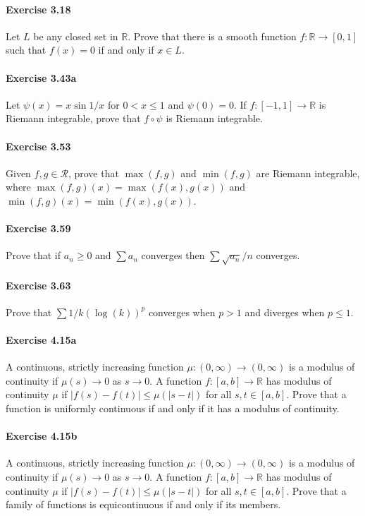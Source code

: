 \documentclass{article}
\begin{document}
\paragraph{Exercise 3.18} Let $L$ be any closed set in $\mathbb{R}$. Prove that there is a smooth function $f \colon \mathbb{R} \rightarrow [0, 1]$ such that $f(x) = 0$ if and only if $x \in L$.

\paragraph{Exercise 3.43a} Let $\psi(x) = x \sin 1/x$ for $0 < x \leq 1$ and $\psi(0) = 0$.  If $f \colon [-1, 1] \rightarrow \mathbb{R}$ is Riemann integrable, prove that $f \circ \psi$ is Riemann integrable.

\paragraph{Exercise 3.53} Given $f, g \in \mathcal{R}$, prove that $\max(f, g)$ and $\min(f, g)$ are Riemann integrable, where $\max(f, g)(x) = \max(f(x), g(x))$ and $\min(f, g)(x) = \min(f(x), g(x))$.

\paragraph{Exercise 3.59} Prove that if $a_n \geq 0$ and $\sum a_n$ converges then $\sum \sqrt{a_n}/n$ converges.

\paragraph{Exercise 3.63} Prove that $\sum 1/k(\log(k))^p$ converges when $p > 1$ and diverges when $p \leq 1$.

\paragraph{Exercise 4.15a} A continuous, strictly increasing function $\mu \colon (0, \infty) \rightarrow (0, \infty)$ is a modulus of continuity if $\mu(s) \rightarrow 0$ as $s \rightarrow 0$. A function $f \colon [a, b] \rightarrow \mathbb{R}$ has modulus of continuity $\mu$ if $|f(s) - f(t)| \leq \mu(|s - t|)$ for all $s, t \in [a, b]$. Prove that a function is uniformly continuous if and only if it has a modulus of continuity.

\paragraph{Exercise 4.15b} A continuous, strictly increasing function $\mu \colon (0, \infty) \rightarrow (0, \infty)$ is a modulus of continuity if $\mu(s) \rightarrow 0$ as $s \rightarrow 0$. A function $f \colon [a, b] \rightarrow \mathbb{R}$ has modulus of continuity $\mu$ if $|f(s) - f(t)| \leq \mu(|s - t|)$ for all $s, t \in [a, b]$. Prove that a family of functions is equicontinuous if and only if its members.
\end{document}
